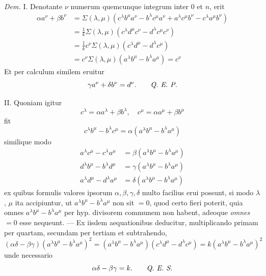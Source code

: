\textit{Dem.} I. Denotante $\nu$ numerum quemcunque integrum inter $0$ et $n$, erit
\[
\begin{aligned}
\alpha a^\nu+\beta b^\nu
&=\Sigma(\lambda,\mu)(c^\lambda b^\mu a^\nu-b^\lambda c^\mu a^\nu+a^\lambda c^\mu b^\nu-c^\lambda a^\mu b^\nu)\\
&=\frac1k\Sigma(\lambda,\mu)(c^\lambda d^\mu c^\nu-d^\lambda c^\mu c^\nu)\\
&=\frac1k c^\nu\Sigma(\lambda,\mu)(c^\lambda d^\mu-d^\lambda c^\mu)\\
&=c^\nu\Sigma(\lambda,\mu)(a^\lambda b^\mu-b^\lambda a^\mu)=c^\nu
\end{aligned}
\]
Et per calculum similem eruitur
\[
\gamma a^\nu+\delta b^\nu=d^\nu.\qquad\text{\textit{Q. E. P.}}
\]

II. Quoniam igitur
\[
c^\lambda=\alpha a^\lambda+\beta b^\lambda,\quad c^\mu=\alpha a^\mu+\beta b^\mu
\]
fit
\[
c^\lambda b^\mu-b^\lambda c^\mu=\alpha(a^\lambda b^\mu-b^\lambda a^\mu)
\]
similique modo
\[
\begin{aligned}
a^\lambda c^\mu-c^\lambda a^\mu&=\beta(a^\lambda b^\mu-b^\lambda a^\mu)\\
d^\lambda b^\mu-b^\lambda d^\mu&=\gamma(a^\lambda b^\mu-b^\lambda a^\mu)\\
a^\lambda d^\mu-d^\lambda a^\mu&=\delta(a^\lambda b^\mu-b^\lambda a^\mu)
\end{aligned}
\]
ex quibus formulis valores ipsorum $\alpha,\beta,\gamma,\delta$ multo facilius erui possunt, si modo $\lambda$, $\mu$ ita accipiuntur, ut $a^\lambda b^\mu-b^\lambda a^\mu$ non sit $=0$, quod certo fieri poterit, quia omnes $a^\lambda b^\mu-b^\lambda a^\mu$ per hyp. divisorem communem non habent, adeoque \textit{omnes} $=0$ esse nequeunt. --- Ex iisdem aequationibus deducitur, multiplicando primam per quartam, secundam per tertiam et subtrahendo,
\[
(\alpha\delta-\beta\gamma)(a^\lambda b^\mu-b^\lambda a^\mu)^2
=(a^\lambda b^\mu-b^\lambda a^\mu)(c^\lambda d^\mu-d^\lambda c^\mu)
=k(a^\lambda b^\mu-b^\lambda a^\mu)^2
\]
unde necessario
\[
\alpha\delta-\beta\gamma=k.\qquad\text{\textit{Q. E. S.}}
\]

